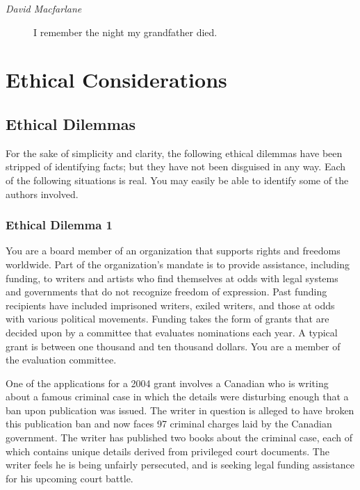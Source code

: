 \documentclass[letterpaper,oneside]{memoir}
\begin{document}
\begin{description}
\begin{description}
\item [\textit{David Macfarlane}] I remember the night my grandfather died.

\end{description}
\chapter{Ethical Considerations}
\begin{epigraphs}
\end{epigraphs}
\section{Ethical Dilemmas}For the sake of simplicity and clarity, the following ethical dilemmas have been stripped of identifying facts; but they have not been disguised in any way. Each of the following situations is real. You may easily be able to identify some of the authors involved.
\subsection{Ethical Dilemma 1}
You are a board member of an organization that supports rights and freedoms worldwide. Part of the organization's mandate is to provide assistance, including funding, to writers and artists who find themselves at odds with legal systems and governments that do not recognize freedom of expression. Past funding recipients have included imprisoned writers, exiled writers, and those at odds with various political movements. Funding takes the form of grants that are decided upon by a committee that evaluates nominations each year. A typical grant is between one thousand and ten thousand dollars. You are a member of the evaluation committee.

One of the applications for a 2004 grant involves a Canadian who is writing about a famous criminal case in which the details were disturbing enough that a ban upon publication was issued. The writer in question is alleged to have broken this publication ban and now faces 97 criminal charges laid by the Canadian government. The writer has published two books about the criminal case, each of which contains unique details derived from privileged court documents. The writer feels he is being unfairly persecuted, and is seeking legal funding assistance for his upcoming court battle.


\end{description}
\end{document}

